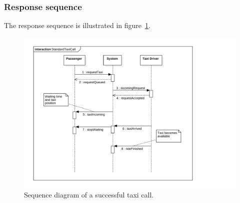 \subsubsection{Response sequence}
The response sequence is illustrated in figure~\ref{sequence-taxicall}.
\begin{figure}[ht]
\label{sequence-taxicall}
\includegraphics[width=\textwidth]{diagrams/sequence_taxicall.pdf}
\caption{Sequence diagram of a successful taxi call.}
\end{figure}

